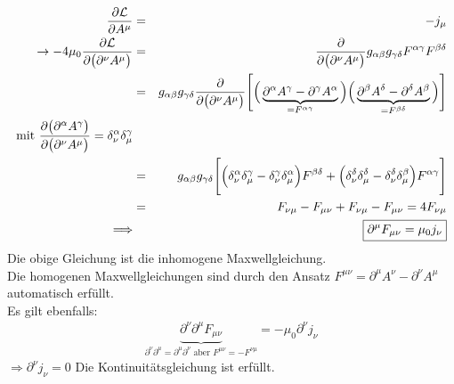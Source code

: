\begin{eqnarray*} \frac{\partial \mathcal L}{\partial A^ {\mu}}&=& - j_{\mu}\\
\rightarrow -4\mu_0 \frac{\partial \mathcal L}{\partial\big ( \partial^ {\nu}A^{\mu}\big)} &=& \frac{\partial}{\partial \big(\partial^ {\nu}A^{ \mu}\big)} g_{\alpha\beta}g_{\gamma\delta}F^ {\alpha\gamma}F^{\beta\delta}\\
&=& g_{\alpha\beta}g_{\gamma\delta}\frac{\partial}{\partial\big(\partial^{\nu}A^{\mu}\big)} \Bigg[\Big( \underbrace{\partial^{\alpha}A^{\gamma}-\partial^{\gamma}A^{\alpha}}_{=F^{\alpha\gamma}}\Big)\Big(\underbrace{\partial^ {\beta}A^ {\delta}-\partial^ { \delta}A^ {\beta}}_{=F^{\beta\delta}}\Big)\Bigg]\\
\text{mit } \frac{\partial \big (\partial^ {\alpha}A^ {\gamma}\big )}{\partial\big(\partial^ {\nu}A^ {\mu}\big )} = \delta_{\nu}^ {\alpha}\delta_{\mu}^ {\gamma}\\
&=& g_{\alpha\beta}g_{\gamma\delta} \Bigg[\Big(\delta_{\nu}^ {\alpha}\delta_{\mu}^ {\gamma}-\delta_{\nu}^ {\gamma}\delta_{\mu}^ {\alpha}\Big) F^ {\beta\delta} + \Big(\delta_{\nu}^ {\delta}\delta_{\mu}^ {\delta} - \delta_{\nu}^ {\delta}\delta_{\mu}^ {\beta}\Big )F^ {\alpha\gamma} \Bigg]\\
&=& F_{\nu\mu}-F_{\mu\nu}+F_{\nu\mu}-F_{\mu\nu} = 4 F_{\nu\mu}\\
\Longrightarrow &{}& \boxed{\partial^ {\mu}F_{\mu\nu} = \mu_0 j_{\nu}}
\end{eqnarray*}
Die obige Gleichung ist die inhomogene Maxwellgleichung.\\
Die homogenen Maxwellgleichungen sind durch den Ansatz $F^ {\mu\nu} = \partial^ {\mu}A^ {\nu}-\partial^ {\nu}A^ {\mu}$ automatisch erfüllt.\\
Es gilt ebenfalls:
\begin{eqnarray*}
\underbrace{\partial^{\nu}\partial^{\mu}F_{\mu\nu}}_{\partial^ {\nu}\partial^ {\mu}=\partial^ {\mu}\partial^ {\nu} \text{ aber }F^ {\mu\nu}= -F^ {\nu\mu}} = -\mu_0\partial^ {\nu}j_{\nu}
\end{eqnarray*}
$\Longrightarrow \partial^ {\nu} j_{\nu} = 0$ Die Kontinuitätsgleichung ist erfüllt.\\



